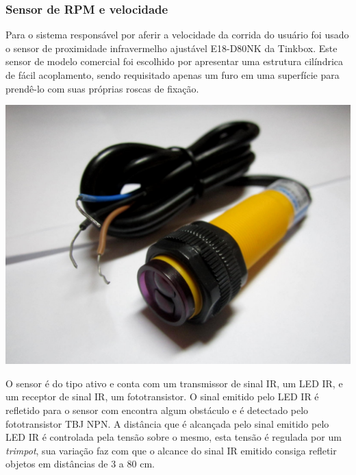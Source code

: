 \subsubsection{Sensor de RPM e velocidade}    

		Para o sistema responsável por aferir a velocidade da corrida do usuário foi usado o sensor de proximidade infravermelho ajustável E18-D80NK da Tinkbox. Este sensor de modelo comercial foi escolhido por apresentar uma estrutura cilíndrica de fácil acoplamento, sendo requisitado apenas um furo em uma superfície para prendê-lo com suas próprias roscas de fixação.
        
            \begin{center}
    	\includegraphics[scale=0.40]{figuras/ed18.jpg}
        \label{ir_model}
    \end{center}
    
	O sensor é do tipo ativo e conta com um transmissor de sinal IR, um LED IR, e um receptor de sinal IR, um fototransistor. O sinal emitido pelo LED IR é refletido para o sensor com encontra algum obstáculo e é detectado pelo fototransistor TBJ NPN. A distância que é alcançada pelo sinal emitido pelo LED IR é controlada pela tensão sobre o mesmo, esta tensão é regulada por um \textit{trimpot}, sua variação faz com que o alcance do sinal IR emitido consiga refletir objetos em distâncias de 3 a 80 cm. 
    
